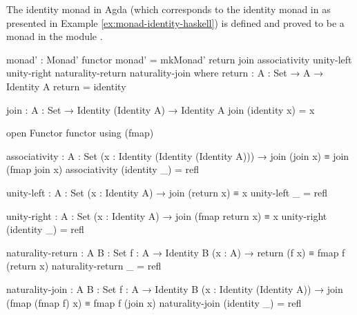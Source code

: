 \begin{example}
  \label{ex:monad-identity-agda}

  The identity monad in Agda (which corresponds to the identity monad
  in \hask as presented in Example \ref{ex:monad-identity-haskell}) is
  defined and proved to be a monad in the module
  .
  \begin{codeagda}
monad' : Monad' functor
monad' = mkMonad' return join associativity unity-left unity-right
                  naturality-return naturality-join
  where
    return : {A : Set} → A → Identity A
    return = identity

    join : {A : Set} → Identity (Identity A) → Identity A
    join (identity x) = x

    open Functor functor using (fmap)

    associativity : {A : Set} (x : Identity (Identity (Identity A))) →
                    join (join x) ≡ join (fmap join x)
    associativity (identity _) = refl

    unity-left : {A : Set} (x : Identity A) → join (return x) ≡ x
    unity-left _ = refl

    unity-right : {A : Set} (x : Identity A) → join (fmap return x) ≡ x
    unity-right (identity _) = refl

    naturality-return : {A B : Set} {f : A → Identity B} (x : A) →
                        return (f x) ≡ fmap f (return x)
    naturality-return _ = refl

    naturality-join : {A B : Set} {f : A → Identity B}
                      (x : Identity (Identity A)) →
                      join (fmap (fmap f) x) ≡ fmap f (join x)
    naturality-join (identity _) = refl
  \end{codeagda}

\end{example}

